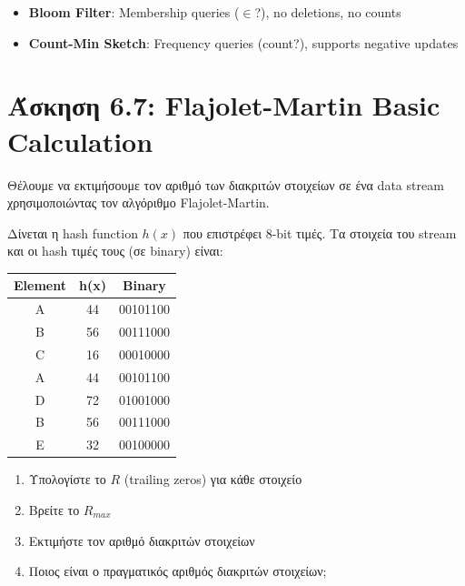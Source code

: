 \begin{infobox}[Σύγκριση]
\begin{itemize}
    \item \textbf{Bloom Filter}: Membership queries ($\in$?), no deletions, no counts
    \item \textbf{Count-Min Sketch}: Frequency queries (count?), supports negative updates
\end{itemize}
\end{infobox}

\section{Άσκηση 6.7: Flajolet-Martin Basic Calculation}

\begin{formulabox}[Εκφώνηση]
Θέλουμε να εκτιμήσουμε τον αριθμό των διακριτών στοιχείων σε ένα data stream
χρησιμοποιώντας τον αλγόριθμο Flajolet-Martin.

Δίνεται η hash function $h(x)$ που επιστρέφει 8-bit τιμές. Τα στοιχεία του stream
και οι hash τιμές τους (σε binary) είναι:

\begin{center}
\begin{tabular}{ccc}
\toprule
\textbf{Element} & \textbf{h(x)} & \textbf{Binary} \\
\midrule
A & 44 & 00101100 \\
B & 56 & 00111000 \\
C & 16 & 00010000 \\
A & 44 & 00101100 \\
D & 72 & 01001000 \\
B & 56 & 00111000 \\
E & 32 & 00100000 \\
\bottomrule
\end{tabular}
\end{center}

\begin{enumerate}
    \item Υπολογίστε το $R$ (trailing zeros) για κάθε στοιχείο
    \item Βρείτε το $R_{max}$
    \item Εκτιμήστε τον αριθμό διακριτών στοιχείων
    \item Ποιος είναι ο πραγματικός αριθμός διακριτών στοιχείων;
\end{enumerate}
\end{formulabox}

